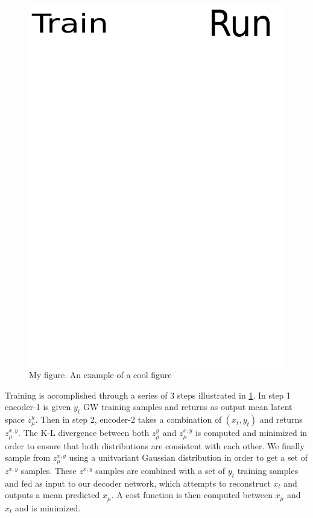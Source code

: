 \documentclass[%
showpacs,
 amsmath,amssymb,
 aps,
 twocolumn,
 prl,
 reprint,
floatfix,
]{revtex4-1}
\begin{document}
\begin{figure}
    \includegraphics[width=\columnwidth]{images/network_setup.png}
    \caption{\label{fig:network_config} My figure.  An example of a cool figure}
\end{figure}

%
%
Training is accomplished through a series of 3 steps illustrated in \ref{fig:network_config}. 
In step 1 encoder-1 is given $y_t$ GW training samples and returns as output mean
latent space $z^{y}_{\mu}$. Then in step 2, encoder-2 takes a combination of $(x_{t},y_{t})$ 
and returns $z^{x,y}_{\mu}$. The K-L divergence between both $z^{y}_{\mu}$ and $z^{x,y}_{\mu}$ is 
computed and minimized in order to ensure that both distributions are consistent with each other. 
We finally sample from $z^{x,y}_{\mu}$ using a unitvariant Gaussian distribution 
in order to get a set of $z^{x,y}$ samples. These $z^{x,y}$ samples are combined with 
a set of $y_t$ training samples and fed as input to our decoder network, which attempts 
to reconstruct $x_t$ and outputs a mean predicted $x_{\mu}$. A cost function is then 
computed between $x_{\mu}$ and $x_t$ and is minimized.
\end{document}
